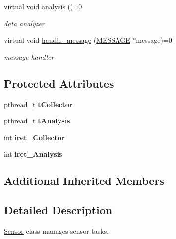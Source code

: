 \begin{DoxyCompactItemize}
virtual void \hyperlink{classSensor_a595d8d9cd87dd3704fad2a313c709a7e}{analysis} ()=0
\begin{DoxyCompactList}\small\item\em data analyzer \end{DoxyCompactList}\item 
virtual void \hyperlink{classSensor_a45533b253f81f85d1b6fcea902a5692b}{handle\-\_\-message} (\hyperlink{SUBSYS__COMMANDS_8h_ad814416fc1a8c675bea2687d96088a8f}{M\-E\-S\-S\-A\-G\-E} $\ast$message)=0
\begin{DoxyCompactList}\small\item\em message handler \end{DoxyCompactList}\end{DoxyCompactItemize}
\subsection*{Protected Attributes}
\begin{DoxyCompactItemize}
\item 
\hypertarget{classSensor_a881761631861338b335680ab1e618277}{pthread\-\_\-t {\bfseries t\-Collector}}\label{classSensor_a881761631861338b335680ab1e618277}

\item 
\hypertarget{classSensor_afce21e3a689654c7d165f2a0e01ab86c}{pthread\-\_\-t {\bfseries t\-Analysis}}\label{classSensor_afce21e3a689654c7d165f2a0e01ab86c}

\item 
\hypertarget{classSensor_af6f47b6f9c15f82dc4f3e92325356763}{int {\bfseries iret\-\_\-\-Collector}}\label{classSensor_af6f47b6f9c15f82dc4f3e92325356763}

\item 
\hypertarget{classSensor_a7227460350eb55d36fae369eda16a774}{int {\bfseries iret\-\_\-\-Analysis}}\label{classSensor_a7227460350eb55d36fae369eda16a774}

\end{DoxyCompactItemize}
\subsection*{Additional Inherited Members}


\subsection{Detailed Description}
\hyperlink{classSensor}{Sensor} class manages sensor tasks. 

